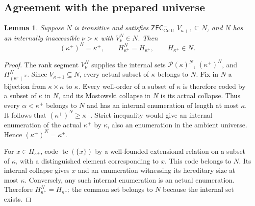 \documentclass[11pt,a4paper]{amsart}
\newtheorem{lemma}[theorem]{Lemma}
\theoremstyle{definition}
\theoremstyle{remark}
\newcommand{\ZFCc}{\mathsf{ZFC}^{-}_{\mathrm{Coll}}}
\DeclareMathOperator{\tc}{tc}
\begin{document}
\subsection{Agreement with the prepared universe}

\begin{lemma}\label{lem:target-H}
Suppose \(N\) is transitive and satisfies \(\ZFCc\),
\(V_{\kappa+1}\subseteq N\), and \(N\) has an
internally inaccessible \(\nu>\kappa\) with
\(V_\nu^N\in N\). Then
\[
 (\kappa^+)^N=\kappa^+,
 \qquad H_{\kappa^+}^N=H_{\kappa^+},
 \qquad H_{\kappa^+}\in N.
\]
\end{lemma}
\begin{proof}
The rank segment \(V_\nu^N\) supplies the internal sets
\(\mathcal P(\kappa)^N\), \((\kappa^+)^N\), and
\(H_{(\kappa^+)^N}^N\). Since \(V_{\kappa+1}\subseteq N\),
every actual subset of \(\kappa\) belongs to \(N\).
Fix in \(N\) a bijection from \(\kappa\times\kappa\) to
\(\kappa\). Every well-order of a subset of \(\kappa\) is
therefore coded by a subset of \(\kappa\) in \(N\), and its
Mostowski collapse in \(N\) is its actual collapse. Thus every
\(\alpha<\kappa^+\) belongs to \(N\) and has an internal
enumeration of length at most \(\kappa\). It follows that
\((\kappa^+)^N\geq\kappa^+\). Strict inequality would give
an internal enumeration of the actual \(\kappa^+\) by
\(\kappa\), also an enumeration in the ambient universe.
Hence \((\kappa^+)^N=\kappa^+\).

For \(x\in H_{\kappa^+}\), code \(\tc(\{x\})\) by a
well-founded extensional relation on a subset of \(\kappa\),
with a distinguished element corresponding to \(x\). This
code belongs to \(N\). Its internal collapse gives \(x\)
and an enumeration witnessing its hereditary size at most
\(\kappa\). Conversely, any such internal enumeration is an
actual enumeration. Therefore
\(H_{\kappa^+}^N=H_{\kappa^+}\); the common set belongs
to \(N\) because the internal set exists.
\end{proof}
\end{document}
